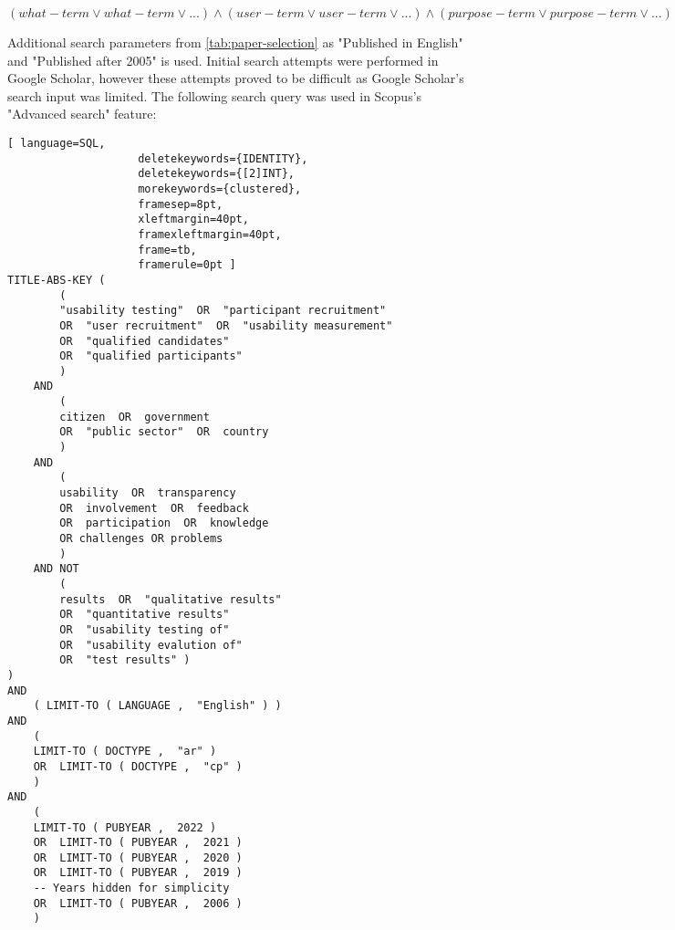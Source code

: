 \begin{center}
$(what-term \lor what-term \lor ...) \land (user-term \lor user-term \lor ...) \land (purpose-term \lor purpose-term \lor ...) \land \neg(exclusion-term \lor exclusion-term \lor ...)$
\end{center}

Additional search parameters from \autoref{tab:paper-selection} as "Published in English" and "Published after 2005" is used. Initial search attempts were performed in Google Scholar, however these attempts proved to be difficult as Google Scholar's search input was limited. The following search query was used in Scopus's "Advanced search" feature:

\begin{lstlisting}[ language=SQL,
                    deletekeywords={IDENTITY},
                    deletekeywords={[2]INT},
                    morekeywords={clustered},
                    framesep=8pt,
                    xleftmargin=40pt,
                    framexleftmargin=40pt,
                    frame=tb,
                    framerule=0pt ]
TITLE-ABS-KEY ( 
        ( 
        "usability testing"  OR  "participant recruitment"  
        OR  "user recruitment"  OR  "usability measurement"  
        OR  "qualified candidates"  
        OR  "qualified participants" 
        )  
    AND  
        ( 
        citizen  OR  government  
        OR  "public sector"  OR  country 
        )  
    AND  
        ( 
        usability  OR  transparency  
        OR  involvement  OR  feedback  
        OR  participation  OR  knowledge
        OR challenges OR problems
        )  
    AND NOT  
        ( 
        results  OR  "qualitative results"  
        OR  "quantitative results"  
        OR  "usability testing of"
        OR  "usability evalution of"
        OR  "test results" ) 
)  
AND 
    ( LIMIT-TO ( LANGUAGE ,  "English" ) ) 
AND  
    ( 
    LIMIT-TO ( DOCTYPE ,  "ar" )  
    OR  LIMIT-TO ( DOCTYPE ,  "cp" ) 
    )  
AND  
    ( 
    LIMIT-TO ( PUBYEAR ,  2022 )  
    OR  LIMIT-TO ( PUBYEAR ,  2021 )  
    OR  LIMIT-TO ( PUBYEAR ,  2020 )  
    OR  LIMIT-TO ( PUBYEAR ,  2019 )
    -- Years hidden for simplicity
    OR  LIMIT-TO ( PUBYEAR ,  2006 ) 
    )
\end{lstlisting}

